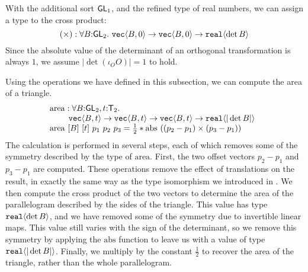 With the additional sort $\mathsf{GL}_1$, and the refined type of real
numbers, we can assign a type to the cross product:
\begin{displaymath}
  (\times) : \forall B \mathord: \SynGL{2}.\ \tyPrim{vec}{B,0} \to \tyPrim{vec}{B,0} \to \tyPrim{real}{\det B}
\end{displaymath}
Since the absolute value of the determinant of an orthogonal
transformation is always $1$, we assume $|\det (\iota_O O)| = 1$ to
hold.

\begin{example}\label{ex:area-of-triangle-1}
  Using the operations we have defined in this subsection, we can
  compute the area of a triangle. 
  \begin{displaymath}
    \begin{array}{@{}l}
      \mathrm{area} : \forall B\mathord:\SynGL{2}, t\mathord:\SynTransl{2}.\ \\
      \hspace{0.8cm}\tyPrim{vec}{B, t} \to \tyPrim{vec}{B, t} \to \tyPrim{vec}{B, t} \to \tyPrim{real}{|\det B|} \\
      \mathrm{area}\ [B]\ [t]\ p_1\ p_2\ p_3 = \frac{1}{2} * \mathrm{abs}\ ((p_2 - p_1) \times (p_3 - p_1))
    \end{array}
  \end{displaymath}
  The calculation is performed in several steps, each of which removes
  some of the symmetry described by the type of
  $\mathrm{area}$. First, the two offset vectors $p_2 - p_1$ and $p_3
  - p_1$ are computed. These operations remove the effect of
  translations on the result, in exactly the same way as the type
  isomorphism we introduced in . We then compute
  the cross product of the two vectors to determine the area of the
  parallelogram described by the sides of the triangle. This value has
  type $\texttt{real}\langle \det B \rangle$, and we have removed some of the
  symmetry due to invertible linear maps. This value still varies with
  the sign of the determinant, so we remove this symmetry by applying
  the $\mathrm{abs}$ function to leave us with a value of type
  $\texttt{real}\langle |\det B| \rangle$. Finally, we multiply by the constant
  $\frac{1}{2}$ to recover the area of the triangle, rather than the
  whole parallelogram.


\end{example}
